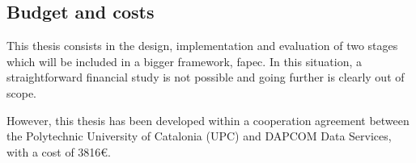 \subsection{Budget and costs}
This thesis consists in the design, implementation and evaluation of two stages which will be included in a bigger framework, \acrshort{fapec}. In this situation, a straightforward financial study is not possible and going further is clearly out of scope.

However, this thesis has been developed within a cooperation agreement between the Polytechnic University of Catalonia (UPC) and DAPCOM Data Services, with a cost of 3816€.
